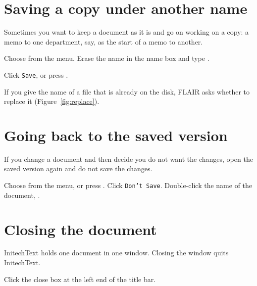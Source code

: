 \section{Saving a copy under another name}
Sometimes you want to keep a document as it is and go on working on a copy:
a memo to one department, say, as the start of a memo to another.
\begin{TaskSteps}
\Step Choose  from the  menu.
\Step Erase the name in the name box and type .
\end{TaskSteps}


\begin{TaskSteps}[resume]
\Step Click \texttt{Save}, or press .
\end{TaskSteps}
If you give the name of a file that is already on the disk, FLAIR asks
whether to replace it (Figure~\ref{fig:replace}).

\section{Going back to the saved version}
If you change a document and then decide you do not want the changes, open
the saved version again and do not save the changes.
\begin{TaskSteps}
\Step Choose  from the  menu, or press
.
\Step Click \texttt{Don't Save}.
\Step Double-click the name of the document, .
\end{TaskSteps}


\section{Closing the document}
InitechText holds one document in one window.  Closing the window quits
InitechText.
\begin{TaskSteps}
\Step Click the close box at the left end of the title bar.
\end{TaskSteps}

